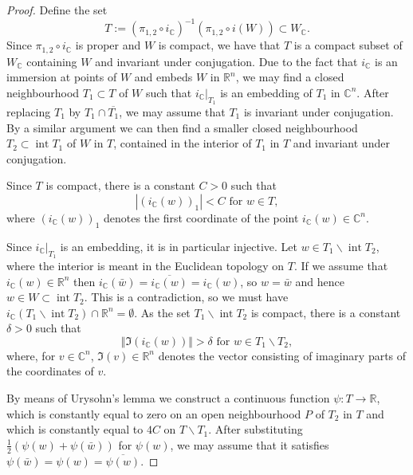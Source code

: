 \documentclass{amsart}
\theoremstyle{plain}
\theoremstyle{definition}
\theoremstyle{remark}
\numberwithin{equation}{thm} %
\newcommand{\R}{\mathbb{R}}
\newcommand{\C}{\mathbb{C}}
\DeclareMathOperator{\Int}{int}
\begin{document}
\begin{proof}
Define the set 
\begin{equation*}
    T:=(\pi_{1,2}\circ i_\C)^{-1}(\pi_{1,2}\circ i(W))\subset W_\C.
\end{equation*}
Since $\pi_{1,2}\circ i_\C$ is proper and $W$ is compact, we have that $T$ is a compact subset of $W_\C$ containing $W$ and invariant under conjugation. Due to the fact that $i_\C$ is an immersion at points of $W$ and embeds $W$ in $\R^n$, we may find a closed neighbourhood $T_1\subset T$ of $W$ such that $i_\C\vert_{T_1}$ is an embedding of $T_1$ in $\C^n$. After replacing $T_1$ by $T_1\cap \overline{T_1}$, we may assume that $T_1$ is invariant under conjugation. By a similar argument we can then find a smaller closed neighbourhood $T_2\subset \Int T_1$ of $W$ in $T$, contained in the interior of $T_1$ in $T$ and invariant under conjugation.

Since $T$ is compact, there is a constant $C>0$ such that 
\begin{equation}
    |(i_\C(w))_1|<C\text{ for }w\in T, \label{eqC}
\end{equation}
where $(i_\C(w))_1$ denotes the first coordinate of the point $i_\C(w)\in \C^n$. 

Since $i_\C\vert_{T_1}$ is an embedding, it is in particular injective. Let $w\in T_1\backslash \Int T_2$, where the interior is meant in the Euclidean topology on $T$. If we assume that $i_\C(w)\in \R^n$ then $i_\C(\bar w)=\overline{i_\C(w)}=i_\C(w)$, so $w=\bar w$ and hence $w\in W\subset \Int T_2$. This is a contradiction, so we must have $i_\C(T_1\backslash \Int T_2)\cap \R^n=\emptyset$. As the set $T_1\backslash \Int T_2$ is compact, there is a constant $\delta>0$ such that 
\begin{equation}\label{eq:imIneq}
    \Vert \Im(i_\C(w))\Vert>\delta\text{ for }w\in T_1\backslash T_2,
\end{equation}
where, for $v\in \C^n$, $\Im(v)\in \R^n$ denotes the vector consisting of imaginary parts of the coordinates of $v$.

By means of Urysohn's lemma we construct a continuous function $\psi:T\rightarrow \R$, which is constantly equal to zero on an open neighbourhood $P$ of $T_2$ in $T$ and which is constantly equal to $4C$ on $T\backslash T_1$. After substituting $\frac{1}{2}(\psi(w)+\psi(\bar w))$ for $\psi(w)$, we may assume that it satisfies $\psi(\bar w)=\psi(w)=\overline{\psi(w)}$. 


\end{proof}
\end{document}
